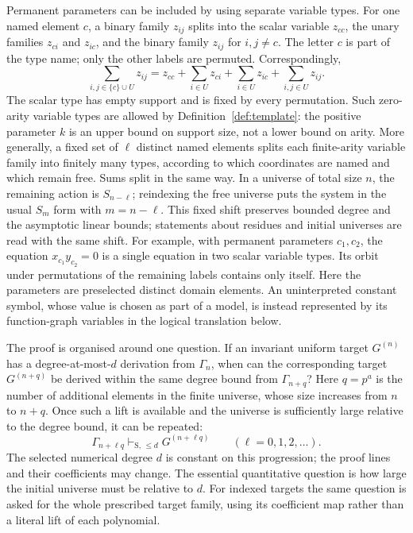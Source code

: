 Permanent parameters can be included by using separate variable types.
For one named element $c$, a binary family $z_{ij}$ splits into the
scalar variable $z_{cc}$, the unary families $z_{ci}$ and $z_{ic}$,
and the binary family $z_{ij}$ for $i,j\ne c$. The letter $c$ is part
of the type name; only the other labels are permuted. Correspondingly,
\[
 \sum_{i,j\in\{c\}\cup U}z_{ij}
 =z_{cc}+\sum_{i\in U}z_{ci}+\sum_{i\in U}z_{ic}
                                      +\sum_{i,j\in U}z_{ij}.
\]
The scalar type has empty support and is fixed by every permutation.
Such zero-arity variable types are allowed by
Definition~\ref{def:template}: the positive parameter $k$ is an upper
bound on support size, not a lower bound on arity. More generally,
a fixed set of $\ell$ distinct named elements splits each finite-arity
variable family into finitely many types, according to which coordinates
are named and which remain free. Sums split in the same way. In a
universe of total size $n$, the remaining action is $S_{n-\ell}$;
reindexing the free universe puts the system in the usual $S_m$ form
with $m=n-\ell$. This fixed shift preserves bounded degree and the
asymptotic linear bounds; statements about residues and initial universes
are read with the same shift. For example, with permanent parameters
$c_1,c_2$, the equation $x_{c_1}y_{c_2}=0$ is a single equation in two
scalar variable types. Its orbit under permutations of the remaining
labels contains only itself.
Here the parameters are preselected distinct domain elements. An
uninterpreted constant symbol, whose value is chosen as part of a model,
is instead represented by its function-graph variables in the logical
translation below.

The proof is organised around one question. If an invariant uniform
target $G^{(n)}$ has a degree-at-most-$d$ derivation from $\Gamma_n$, when
can the corresponding target $G^{(n+q)}$ be derived within the same
degree bound from $\Gamma_{n+q}$? Here $q=p^a$ is the number of additional
elements in the finite universe, whose size increases from $n$ to $n+q$. Once such a lift is available and the universe is sufficiently large
relative to the degree bound, it can be repeated:
\[
 \Gamma_{n+\ell q}\vdash_{\mathrm S,\,\le d}G^{(n+\ell q)}
                    \qquad(\ell=0,1,2,\ldots).
\]
The selected numerical degree $d$ is constant on this progression;
the proof lines and their coefficients may change. The essential
quantitative question is how large the initial universe must be relative
to $d$. For indexed targets the same question is asked for the whole
prescribed target family, using its coefficient map rather than a
literal lift of each polynomial.

